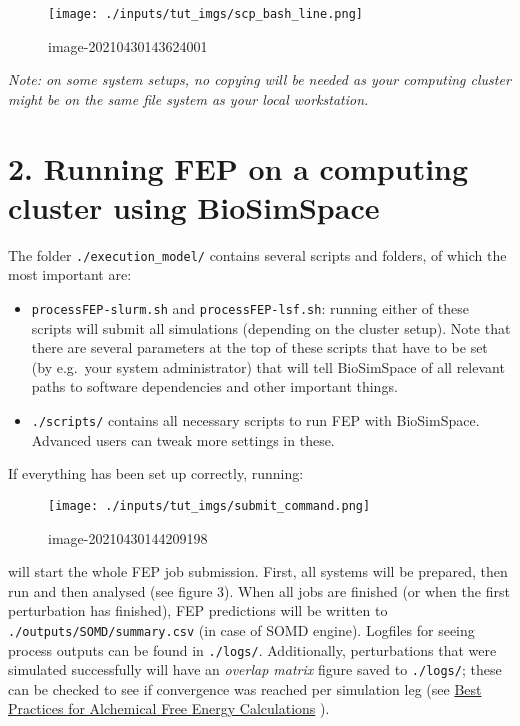 \begin{figure}
\centering
\texttt{[image: ./inputs/tut\_imgs/scp\_bash\_line.png]}
\caption{image-20210430143624001}
\end{figure}

\emph{Note: on some system setups, no copying will be needed as your
computing cluster might be on the same file system as your local
workstation.}

\hypertarget{running-fep-on-a-computing-cluster-using-biosimspace}{%
\section{2. Running FEP on a computing cluster using
BioSimSpace}\label{running-fep-on-a-computing-cluster-using-biosimspace}}

The folder \texttt{./execution\_model/} contains several scripts and
folders, of which the most important are:

\begin{itemize}
\tightlist
\item
  \texttt{processFEP-slurm.sh} and \texttt{processFEP-lsf.sh}: running
  either of these scripts will submit all simulations (depending on the
  cluster setup). Note that there are several parameters at the top of
  these scripts that have to be set (by e.g.~your system administrator)
  that will tell BioSimSpace of all relevant paths to software
  dependencies and other important things.
\item
  \texttt{./scripts/} contains all necessary scripts to run FEP with
  BioSimSpace. Advanced users can tweak more settings in these.
\end{itemize}

If everything has been set up correctly, running:

\begin{figure}
\centering
\texttt{[image: ./inputs/tut\_imgs/submit\_command.png]}
\caption{image-20210430144209198}
\end{figure}

will start the whole FEP job submission. First, all systems will be
prepared, then run and then analysed (see figure 3). When all jobs are
finished (or when the first perturbation has finished), FEP predictions
will be written to \texttt{./outputs/SOMD/summary.csv} (in case of SOMD
engine). Logfiles for seeing process outputs can be found in
\texttt{./logs/}. Additionally, perturbations that were simulated
successfully will have an \emph{overlap matrix} figure saved to
\texttt{./logs/}; these can be checked to see if convergence was reached
per simulation leg (see
\href{https://www.livecomsjournal.org/article/18378-best-practices-for-alchemical-free-energy-calculations-article-v1-0}{Best
Practices for Alchemical Free Energy Calculations} ).

